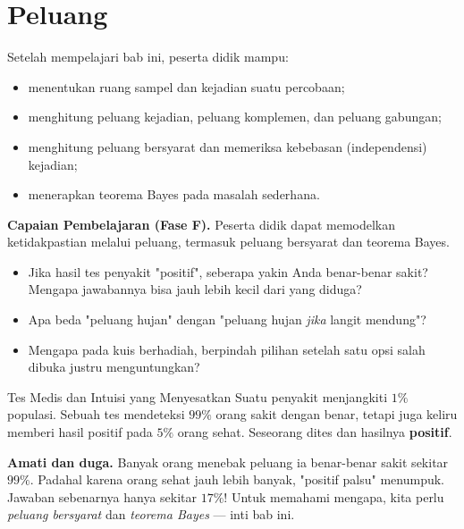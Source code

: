\documentclass[11pt,a4paper]{report}
\theoremstyle{gaya}
\begin{document}
\chapter{Peluang}
\begin{tujuan}
Setelah mempelajari bab ini, peserta didik mampu:
\begin{itemize}[leftmargin=*,topsep=2pt]
  \item menentukan ruang sampel dan kejadian suatu percobaan;
  \item menghitung peluang kejadian, peluang komplemen, dan peluang gabungan;
  \item menghitung peluang bersyarat dan memeriksa kebebasan (independensi) kejadian;
  \item menerapkan teorema Bayes pada masalah sederhana.
\end{itemize}
\textbf{Capaian Pembelajaran (Fase F).} Peserta didik dapat memodelkan ketidakpastian melalui peluang, termasuk peluang bersyarat dan teorema Bayes.
\end{tujuan}

\begin{pemantik}
\begin{itemize}[leftmargin=*,topsep=2pt]
  \item Jika hasil tes penyakit "positif", seberapa yakin Anda benar-benar sakit? Mengapa jawabannya bisa jauh lebih kecil dari yang diduga?
  \item Apa beda "peluang hujan" dengan "peluang hujan \emph{jika} langit mendung"?
  \item Mengapa pada kuis berhadiah, berpindah pilihan setelah satu opsi salah dibuka justru menguntungkan?
\end{itemize}
\end{pemantik}

\begin{studikasus}{Tes Medis dan Intuisi yang Menyesatkan}
Suatu penyakit menjangkiti $1\%$ populasi. Sebuah tes mendeteksi $99\%$ orang sakit dengan benar, tetapi juga keliru memberi hasil positif pada $5\%$ orang sehat. Seseorang dites dan hasilnya \textbf{positif}.
\smallskip

\textbf{Amati dan duga.} Banyak orang menebak peluang ia benar-benar sakit sekitar $99\%$. Padahal karena orang sehat jauh lebih banyak, "positif palsu" menumpuk. Jawaban sebenarnya hanya sekitar $17\%$! Untuk memahami mengapa, kita perlu \emph{peluang bersyarat} dan \emph{teorema Bayes} --- inti bab ini.
\end{studikasus}
\end{document}
